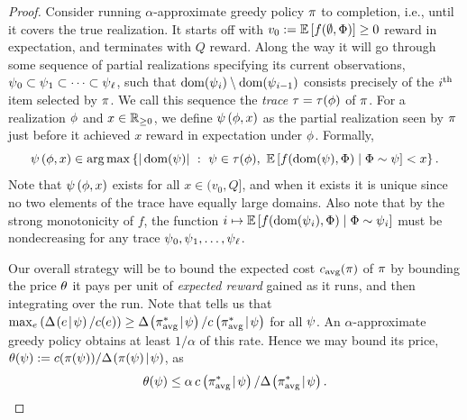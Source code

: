 \begin{proof}
Consider running $\alpha$-approximate greedy policy $\policy$ to
completion, i.e., until it covers the true realization.
%
%
It starts off with $v_0 := \expctoverrlz{\rlz}{f(\emptyset, \rvrlz)} \ge 0$
reward in expectation, and terminates with $Q$ reward.
%
%
%
Along the way it will go through some sequence of partial realizations
specifying its current observations, $\prlz_0 \subset \prlz_1 \subset
\cdots \subset \prlz_{\ell}$, such that $\dom(\prlz_{i}) \setminus
\dom(\prlz_{i-1})$ consists precisely of the $\ith$ item selected by
$\policy$.
We call this sequence the \emph{trace} $\trace = \trace(\rlz)$ of
$\policy$.  
%
%
For a realization $\rlz$ and $x \in \NonNegativeReals$, we
define $\ptrace{\rlz}{x}$ as the partial realization seen by
$\policy$ just before it achieved $x$ reward in expectation under $\rlz$.  Formally, 
\begin{equation}
  \label{eq:avg1}
  \ptrace{\rlz}{x} \in \argmax \set{ |\dom(\prlz) | \ : \ \prlz \in
    \trace(\rlz), \  \expctoverrlz{\rvrlz}{  f(\dom(\prlz), \rvrlz) \mid \rvrlz \sim \prlz  } < x }.
\end{equation}
Note that $\ptrace{\rlz}{x}$ exists for all $x \in (v_0, Q]$, and
when it exists it is unique since no two elements of the trace have
equally large domains.  Also note that by the strong \term monotonicity of $f$, 
the function 
$i \mapsto \expctoverrlz{\rvrlz}{ f(\dom(\prlz_i), \rvrlz) \mid \rvrlz \sim \prlz_i  } $
must be nondecreasing for any trace $\prlz_0, \prlz_1, \ldots,
\prlz_{\ell}$.


Our overall strategy will be to bound the expected cost $\acst{\policy}$ of
$\policy$ by bounding the price $\price$ it pays per unit of \emph{expected reward}
gained as it runs, and then integrating over the run. 
Note that  tells us that $ \max_e \paren{\diff{\prlz}{e}/c(e)} \ge
  \diff{\prlz}{ \piavg } / \condcost{\prlz}{\piavg} $ for all $\prlz$.
  An $\alpha$-approximate greedy policy obtains at least $1/\alpha$ of
  this rate.  Hence we may bound its price, $\price(\prlz) :=
  c(\policy(\prlz)) / \diff{\prlz}{\policy(\prlz)}$, as 
  \begin{equation}
    \label{eq:price-bound}
 \price(\prlz) \le \alpha \, \condcost{\prlz}{\piavg} / \diff{\prlz}{\piavg }.   
  \end{equation}



\end{proof}
